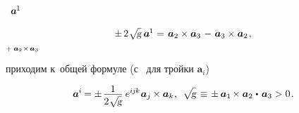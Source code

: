 \begin{otherlanguage}{russian}
~${\bm{a}^{\hspace{-0.1ex}1}\hspace{-0.1ex}}$   

\nopagebreak\vspace{.8em}\begin{equation*}
\begin{array}{l@{\hspace{.3em}}c@{\hspace{.36em}}r}
\pm \hspace{.33ex} 2 \hspace{.1ex} \scalebox{0.95}[0.96]{$\sqrt{\hspace{-0.36ex}\mathstrut{\textsl{g}}}$} \hspace{.5ex} \bm{a}^{\hspace{-0.1ex}1} & = & \bm{a}_2 \times \bm{a}_3 \hspace{.2ex} \tikzmark{BeginPlusToMinus} - \hspace{.2ex} \bm{a}_3 \times \bm{a}_2 \tikzmark{EndPlusToMinus}
\hspace{.2ex} ,
\end{array}
\end{equation*}%
%
{${\scriptstyle {+ \hspace{.4ex} \bm{a}_2 \hspace{.1ex} \times \hspace{.2ex} \bm{a}_3}}$}

\vspace{-1.3em}\noindent
приходим к~общей формуле (с~\inquotes{$-$} для  тройки ${\bm{a}_i}$)

\nopagebreak\begin{equation}\label{basisvectorstocobasisvectors}
\bm{a}^{\hspace{-0.05ex}i} \hspace{-0.2ex}
= \displaystyle \pm \hspace{.2ex} \frac{\raisemath{-0.4ex}{1}}{2 \hspace{.1ex} \scalebox{0.95}[0.96]{$\sqrt{\hspace{-0.36ex}\mathstrut{\textsl{g}}}$}} \hspace{.5ex} e^{i\hspace{-0.1ex}j\hspace{-0.1ex}k} \hspace{.1ex} \bm{a}_j \hspace{-0.1ex} \times \bm{a}_k \hspace{.1ex},
\:\:
\sqrt{\hspace{-0.36ex}\mathstrut{\textsl{g}}} \hspace{.25ex}
\equiv \hspace{.15ex} \pm \hspace{.4ex} \bm{a}_1 \hspace{-0.2ex} \times \bm{a}_2 \hspace{.1ex} \dotp \hspace{.25ex} \bm{a}_3
> 0
\hspace{.2ex} .
\end{equation}


\end{otherlanguage}
